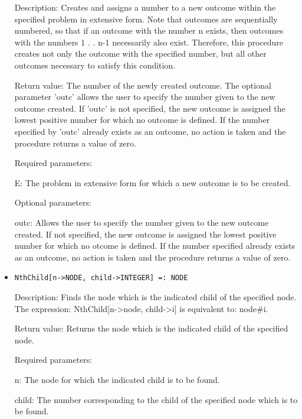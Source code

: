 \begin{itemize}
\bd
\item
[Description:] Creates and assigns a number to a new outcome within
the specified problem in extensive form.  Note that outcomes are
sequentially numbered, so that if an outcome with the number n exists,
then outcomes with the numbers 1 . . n-1 necessarily also exist.
Therefore, this procedure creates not only the outcome with the
specified number, but all other outcomes necessary to satisfy this
condition.
\item
[Return value:] The number of the newly created outcome.  The optional
parameter 'outc' allows the user to specify the number given to the
new outcome created.  If 'outc' is not specified, the new outcome is
assigned the lowest positive number for which no outcome is defined.
If the number specified by 'outc' already exists as an outcome, no
action is taken and the procedure returns a value of zero.
\item
[Required parameters:]\hfil\null

\bd
\item
[E:] The problem in extensive form for which a new outcome is to be
created.
\ed

\item
[Optional parameters:]\hfil\null

\bd
\item
[outc:] Allows the user to specify the number given to the new outcome
created.  If not specified, the new outcome is assigned the lowest
positive number for which no otcome is defined.  If the number
specified already exists as an outcome, no action is taken and the
procedure returns a value of zero.
\ed
\ed

\item
\protect \large \begin{verbatim}
NthChild[n->NODE, child->INTEGER] =: NODE
\end{verbatim}\normalsize

\bd
\item
[Description:] Finds the node which is the indicated child of the
specified node.  The expression: NthChild[n->node, child->i] is
equivalent to: node\#i.
\item
[Return value:] Returns the node which is the indicated child of the
specified node.
\item
[Required parameters:]\hfil\null
	  
\bd
\item
[n:] The node for which the indicated child is to be found.
\item
[child:] The number corresponding to the child of the specified node
which is to be found.
\ed


\end{itemize}
